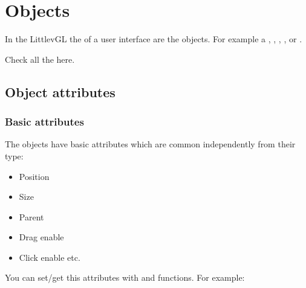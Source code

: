 \documentclass[letterpaper,10pt,english]{sphinxmanual}
\begin{document}
\section{Objects}
\label{\detokenize{overview/objects:objects}}\label{\detokenize{overview/objects::doc}}
In the LittlevGL the  of a user interface are the objects.
For example a {\hyperref[\detokenize{object-types/btn::doc}]{}}, {\hyperref[\detokenize{object-types/label::doc}]{}}, {\hyperref[\detokenize{object-types/img::doc}]{}}, {\hyperref[\detokenize{object-types/list::doc}]{}}, {\hyperref[\detokenize{object-types/chart::doc}]{}} or {\hyperref[\detokenize{object-types/ta::doc}]{}}.

Check all the {\hyperref[\detokenize{object-types/index::doc}]{}} here.


\subsection{Object attributes}
\label{\detokenize{overview/objects:object-attributes}}

\subsubsection{Basic attributes}
\label{\detokenize{overview/objects:basic-attributes}}
The objects have basic attributes which are common independently from their type:
\begin{itemize}
\item {} 
Position

\item {} 
Size

\item {} 
Parent

\item {} 
Drag enable

\item {} 
Click enable etc.

\end{itemize}

You can set/get this attributes with  and  functions. For example:
\end{document}
